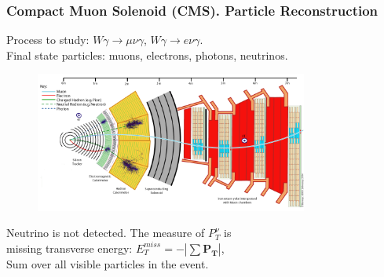 \begin{frame}\frametitle{Compact Muon Solenoid (CMS). Particle Reconstruction}
\scriptsize
Process to study: $W\gamma\rightarrow\mu\nu\gamma$, $W\gamma\rightarrow e\nu\gamma$.\\
Final state particles: muons, electrons, photons, neutrinos.\\
\begin{figure}[htb]
  \begin{center}
    {\includegraphics[width=0.80\textwidth]{../figs/Exp/CMS_Slice.png}}
  \end{center}
\end{figure}

\scriptsize
Neutrino is not detected. The measure of $P_T^{\nu}$ is\\ 
missing transverse energy: $  E_T^{miss} = - | \sum \mathbf{P_T} |$,\\
Sum over all visible particles in the event. 

\end{frame}%


